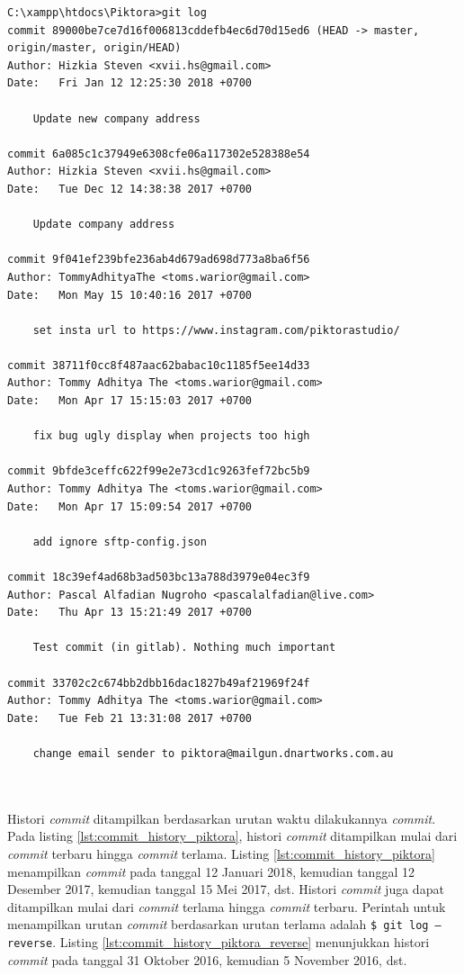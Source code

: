\begin{lstlisting}[caption={Sebagian histori \textit{commit} pada proyek Piktora},label={lst:commit_history_piktora},language=plaintext]
C:\xampp\htdocs\Piktora>git log
commit 89000be7ce7d16f006813cddefb4ec6d70d15ed6 (HEAD -> master, origin/master, origin/HEAD)
Author: Hizkia Steven <xvii.hs@gmail.com>
Date:   Fri Jan 12 12:25:30 2018 +0700

    Update new company address

commit 6a085c1c37949e6308cfe06a117302e528388e54
Author: Hizkia Steven <xvii.hs@gmail.com>
Date:   Tue Dec 12 14:38:38 2017 +0700

    Update company address

commit 9f041ef239bfe236ab4d679ad698d773a8ba6f56
Author: TommyAdhityaThe <toms.warior@gmail.com>
Date:   Mon May 15 10:40:16 2017 +0700

    set insta url to https://www.instagram.com/piktorastudio/

commit 38711f0cc8f487aac62babac10c1185f5ee14d33
Author: Tommy Adhitya The <toms.warior@gmail.com>
Date:   Mon Apr 17 15:15:03 2017 +0700

    fix bug ugly display when projects too high

commit 9bfde3ceffc622f99e2e73cd1c9263fef72bc5b9
Author: Tommy Adhitya The <toms.warior@gmail.com>
Date:   Mon Apr 17 15:09:54 2017 +0700

    add ignore sftp-config.json

commit 18c39ef4ad68b3ad503bc13a788d3979e04ec3f9
Author: Pascal Alfadian Nugroho <pascalalfadian@live.com>
Date:   Thu Apr 13 15:21:49 2017 +0700

    Test commit (in gitlab). Nothing much important

commit 33702c2c674bb2dbb16dac1827b49af21969f24f
Author: Tommy Adhitya The <toms.warior@gmail.com>
Date:   Tue Feb 21 13:31:08 2017 +0700

    change email sender to piktora@mailgun.dnartworks.com.au
    
\end{lstlisting}
\ \\

Histori \textit{commit} ditampilkan berdasarkan urutan waktu dilakukannya \textit{commit}. Pada listing \ref{lst:commit_history_piktora}, histori \textit{commit} ditampilkan mulai dari \textit{commit} terbaru hingga \textit{commit} terlama. Listing \ref{lst:commit_history_piktora} menampilkan \textit{commit} pada tanggal 12 Januari 2018, kemudian tanggal 12 Desember 2017, kemudian tanggal 15 Mei 2017, dst. Histori \textit{commit} juga dapat ditampilkan mulai dari \textit{commit} terlama hingga \textit{commit} terbaru. Perintah untuk menampilkan urutan \textit{commit} berdasarkan urutan terlama adalah \texttt{\$ git log --reverse}. Listing \ref{lst:commit_history_piktora_reverse} menunjukkan histori \textit{commit} pada tanggal 31 Oktober 2016, kemudian 5 November 2016, dst. 

